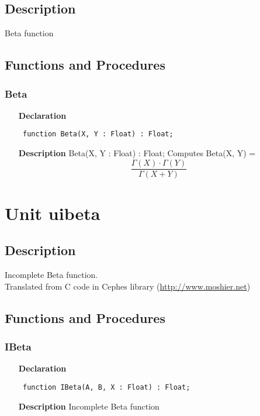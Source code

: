 \documentclass[12pt,a4paper,oneside]{report}
\newcommand{\declarationitem}[1]{\textbf{#1}}
\newcommand{\descriptiontitle}[1]{\textbf{#1}}
\newcommand{\code}[1]{\texttt{#1}}
\begin{document}
\subsection{Description}
Beta function 
\subsection{Functions and Procedures}
\subsubsection{Beta}
\label{ubeta-Beta}
\begin{itemize}\item[\declarationitem{Declaration}\hfill]
\begin{flushleft}
\code{
function Beta(X, Y : Float) : Float;}

\end{flushleft}

\par
\item[\descriptiontitle{Description}]
Beta(X, Y : Float) : Float; Computes Beta(X, Y) = 
$$
\frac{\Gamma(X) \cdot \Gamma(Y)}{\Gamma(X + Y)}
$$
\end{itemize}

\section{Unit uibeta}
\label{uibeta}
\subsection{Description}
Incomplete Beta function.\\ Translated from C code in Cephes library (\href{http://www.moshier.net}{http://www.moshier.net}) \subsection{Functions and Procedures}
\subsubsection{IBeta}
\label{uibeta-IBeta}
\begin{itemize}\item[\declarationitem{Declaration}\hfill]
	\begin{flushleft}
		\code{
			function IBeta(A, B, X : Float) : Float;}
		
	\end{flushleft}
	
	\par
	\item[\descriptiontitle{Description}]
	Incomplete Beta function
	
\end{itemize}
\end{document}
